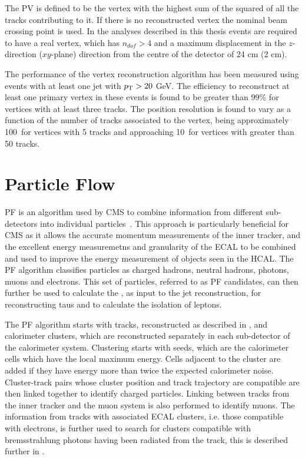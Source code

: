 The \ac{PV} is defined to be the vertex with the highest sum of the squared \pt of all the tracks contributing to it. If there is no reconstructed vertex the nominal beam crossing point is used. In the analyses described in this thesis events are required to have a real vertex, which has $n_{dof}>4$ and a maximum displacement in the $z$-direction ($xy$-plane) direction from the centre of the detector of 24 cm (2 cm).

The performance of the vertex reconstruction algorithm has been measured using events with at least one jet with $p_{\mathrm{T}}>20$ GeV. The efficiency to reconstruct at least one primary vertex in these events is found to be greater than 99\% for vertices with at least three tracks. The position resolution is found to vary as a function of the number of tracks associated to the vertex, being approximately 100\micron\, for vertices with 5 tracks and approaching 10\micron\, for vertices with greater than 50 tracks.

\section{Particle Flow}
\label{sec:pf}
\ac{PF} is an algorithm used by CMS to combine information from different sub-detectors into individual particles~\cite{CMS-PAS-PFT-09-001,CMS-PAS-PFT-10-001,CMS-PAS-PFT-10-002}. This approach is particularly beneficial for CMS as it allows the accurate momentum measurements of the inner tracker, and the excellent energy measuremetns and granularity of the \ac{ECAL} to be combined and used to improve the energy measurement of objects seen in the \ac{HCAL}. The \ac{PF} algorithm classifies particles as charged hadrons, neutral hadrons, photons, muons and electrons. This set of particles, referred to as \ac{PF} candidates, can then further be used to calculate the \MET, as input to the jet reconstruction, for reconstructing taus and to calculate the isolation of leptons.

The \ac{PF} algorithm starts with tracks, reconstructed as described in , and calorimeter clusters, which are reconstructed separately in each sub-detector of the calorimeter system. Clustering starts with seeds, which are the calorimeter cells which have the local maximum energy. Cells adjacent to the cluster are added if they have energy more than twice the expected calorimeter noise. Cluster-track pairs whose cluster position and track trajectory are compatible are then linked together to identify charged particles. Linking between tracks from the inner tracker and the muon system is also performed to identify muons. The information from tracks with associated \ac{ECAL} clusters, i.e. those compatible with electrons, is further used to search for clusters compatible with bremsstrahlung photons having been radiated from the track, this is described further in .

